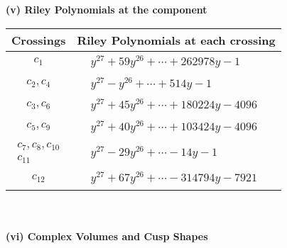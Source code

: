 \documentclass[1p]{elsarticle_modified}
\theoremstyle{definition}
\begin{document}
\newpage\renewcommand{\arraystretch}{1}
\flushleft \textbf{(v) Riley Polynomials at the component}\newline \\
\begin{tabular}{m{50pt}|m{274pt}}
Crossings & \hspace{64pt}Riley Polynomials at each crossing \\
\hline $$\begin{aligned}c_{1}\end{aligned}$$&$\begin{aligned}
&y^{27}+59 y^{26}+\cdots+262978 y-1
\end{aligned}$\\
\hline $$\begin{aligned}c_{2},c_{4}\end{aligned}$$&$\begin{aligned}
&y^{27}- y^{26}+\cdots+514 y-1
\end{aligned}$\\
\hline $$\begin{aligned}c_{3},c_{6}\end{aligned}$$&$\begin{aligned}
&y^{27}+45 y^{26}+\cdots+180224 y-4096
\end{aligned}$\\
\hline $$\begin{aligned}c_{5},c_{9}\end{aligned}$$&$\begin{aligned}
&y^{27}+40 y^{26}+\cdots+103424 y-4096
\end{aligned}$\\
\hline $$\begin{aligned}c_{7},c_{8},c_{10}\\c_{11}\end{aligned}$$&$\begin{aligned}
&y^{27}-29 y^{26}+\cdots-14 y-1
\end{aligned}$\\
\hline $$\begin{aligned}c_{12}\end{aligned}$$&$\begin{aligned}
&y^{27}+67 y^{26}+\cdots-314794 y-7921
\end{aligned}$\\
\hline
\end{tabular}\\~\\
\newpage\flushleft \textbf{(vi) Complex Volumes and Cusp Shapes}
\end{document}
